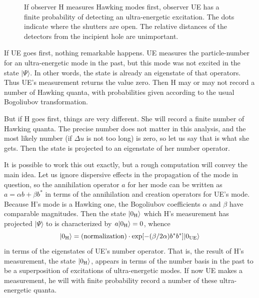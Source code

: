 \documentclass[12pt]{article}
\begin{document}
\begin{figure}[t]
\caption{If observer H measures Hawking modes first, observer UE has a finite probability of detecting an ultra-energetic excitation.  The dots indicate where the shutters are open.  The relative distances of the detectors from the incipient hole are unimportant.}
\end{figure}

If UE goes first, nothing remarkable happens.  UE measures the particle-number for an ultra-energetic mode in the past, but this mode was not excited in the state $|\Psi\rangle$.  In other words, the state is already an eigenstate of that operators.  Thus UE's measurement returns the value zero.  Then H may or may not record a number of Hawking quanta, with probabilities given according to the usual Bogoliubov transformation.



But if H goes first, things are very different.  She will record a finite number of Hawking quanta.  The precise number does not matter in this analysis, and the most likely number (if $\Delta u$ is not too long) is zero, so let us say that is what she gets.  Then the state is projected to an eigenstate of her number operator.



It is possible to work this out exactly, but a rough computation will convey the main idea.  Let us ignore dispersive effects in the propagation of the mode in question, so the annihilation operator $a$ for her mode can  be written as $a=\alpha b+\beta b^*$
in terms of the annihilation and creation operators for UE's mode. 
Because H's mode is a Hawking one, the Bogoliubov coefficients $\alpha$ and $\beta$ have comparable magnitudes.
Then the state $|0_{\rm H}\rangle$ which H's measurement has projected $|\Psi\rangle$ to is characterized by $a|0_{\rm H}\rangle =0$, whence
\begin{equation}
  |0_{\rm H}\rangle =\mbox{(normalization)}\cdot
  \exp [ -(\beta /2\alpha ) b^*b^*] |0_{\rm UE}\rangle
\end{equation}
in terms of the eigenstates of UE's number operator.  That is, the result of H's measurement, the state $|0_{\rm H}\rangle$, appears in terms of the number basis in the past to be a superposition of excitations of ultra-energetic modes.
If now UE makes a measurement, he will with finite probability record a number of these ultra-energetic quanta.
\end{document}
